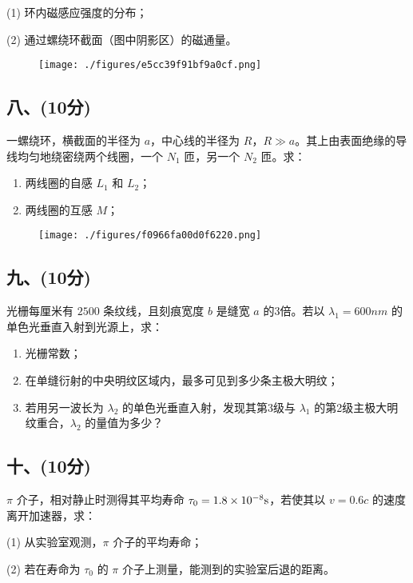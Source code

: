 (1) 环内磁感应强度的分布；

(2) 通过螺绕环截面（图中阴影区）的磁通量。
\begin{figure}[ht]
\centering
\texttt{[image: ./figures/e5cc39f91bf9a0cf.png]}
\caption{} \label{fig_NJU10_7}
\end{figure}
\subsection{八、(10分)}
一螺绕环，横截面的半径为 $a$，中心线的半径为 $R$，$R \gg a$。其上由表面绝缘的导线均匀地绕密绕两个线圈，一个 $N_1$ 匝，另一个 $N_2$ 匝。求：
\begin{enumerate}
    \item 两线圈的自感 $L_1$ 和 $L_2$；
    \item 两线圈的互感 $M$；
\end{enumerate}
\begin{figure}[ht]
\centering
\texttt{[image: ./figures/f0966fa00d0f6220.png]}
\caption{} \label{fig_NJU10_8}
\end{figure}
\subsection{九、(10分)}
光栅每厘米有 $2500$ 条纹线，且刻痕宽度 $b$ 是缝宽 $a$ 的3倍。若以 $\lambda_1 = 600 nm$ 的单色光垂直入射到光源上，求：
\begin{enumerate}
    \item 光栅常数；
    \item 在单缝衍射的中央明纹区域内，最多可见到多少条主极大明纹；
    \item 若用另一波长为 $\lambda_2$ 的单色光垂直入射，发现其第3级与 $\lambda_1$ 的第2级主极大明纹重合，$\lambda_2$ 的量值为多少？
\end{enumerate}
\subsection{十、(10分)}
$\pi$ 介子，相对静止时测得其平均寿命 $\tau_0 = 1.8 \times 10^{-8} \\ \mathrm{s}$，若使其以 $v = 0.6c$ 的速度离开加速器，求：

(1) 从实验室观测，$\pi$ 介子的平均寿命；

(2) 若在寿命为 $\tau_0$ 的 $\pi$ 介子上测量，能测到的实验室后退的距离。

